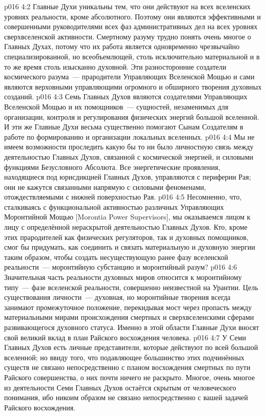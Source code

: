 \vs p016 4:2 Главные Духи уникальны тем, что они действуют на всех вселенских уровнях реальности, кроме абсолютного. Поэтому они являются эффективными и совершенными руководителями всех фаз административных дел на всех уровнях сверхвселенской активности. Смертному разуму трудно понять очень многое о Главных Духах, потому что их работа является одновременно чрезвычайно специализированной, но всеобъемлющей, столь исключительно материальной и в то же время столь изысканно духовной. Эти разносторонние создатели космического разума~--- прародители Управляющих Вселенской Мощью и сами являются верховными управляющими огромного и обширного творения духовных созданий.
\vs p016 4:3 Семь Главных Духов являются создателями Управляющих Вселенской Мощью и их помощников~--- сущностей, незаменимых для организации, контроля и регулирования физических энергий большой вселенной. И эти же Главные Духи весьма существенно помогают Сынам Создателям в работе по формированию и организации локальных вселенных.
\vs p016 4:4 Мы не имеем возможности проследить какую бы то ни было личностную связь между деятельностью Главных Духов, связанной с космической энергией, и силовыми функциями Безусловного Абсолюта. Все энергетические проявления, находящиеся под юрисдикцией Главных Духов, управляются с периферии Рая; они не кажутся связанными напрямую с силовыми феноменами, отождествляемыми с нижней поверхностью Рая.
\vs p016 4:5 Несомненно, что, сталкиваясь с функциональной активностью различных Управляющих Моронтийной Мощью [Morontia Power Supervisors], мы оказываемся лицом к лицу с определённой нераскрытой деятельностью Главных Духов. Кто, кроме этих прародителей как физических регуляторов, так и духовных помощников, смог бы придумать, как соединить и связать материальную и духовную энергии таким образом, чтобы создать несуществующую ранее фазу вселенской реальности~--- моронтийную субстанцию и моронтийный разум?
\vs p016 4:6 Значительная часть реальности духовных миров относится к моронтийному типу~--- фазе вселенской реальности, совершенно неизвестной на Урантии. Цель существования личности~--- духовная, но моронтийные творения всегда занимают промежуточное положение, перекидывая мост через пропасть между материальными мирами происхождения смертных и сверхвселенскими сферами развивающегося духовного статуса. Именно в этой области Главные Духи вносят свой великий вклад в план Райского восхождения человека.
\vs p016 4:7 У Семи Главных Духов есть личные представители, которые действуют по всей большой вселенной; но ввиду того, что подавляющее большинство этих подчинённых существ не связано непосредственно с планом восхождения смертных по пути Райского совершенства, о них почти ничего не раскрыто. Многое, очень многое из деятельности Семи Главных Духов остаётся скрытым от человеческого понимания, ибо никоим образом не связано непосредственно с вашей задачей Райского восхождения.
